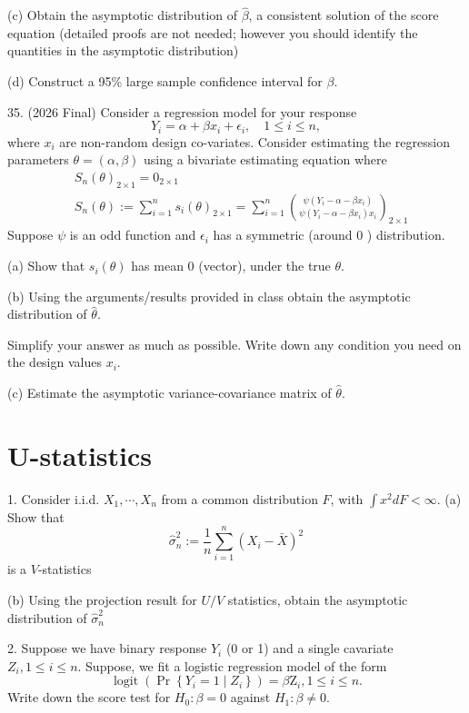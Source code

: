 \documentclass[11pt]{article}
\theoremstyle{definition}
\begin{document}
(c) Obtain the asymptotic distribution of $\widehat{\beta}$, a consistent solution of the score equation (detailed proofs are not needed; however you should identify the quantities in the asymptotic distribution)

(d) Construct a 95\% large sample confidence interval for $\beta$.

35. (2026 Final) Consider a regression model for your response
$$
Y_i=\alpha+\beta x_i+\epsilon_{i},\quad 1 \leq i \leq n,
$$
where $x_i$ are non-random design co-variates. Consider estimating the regression parameters $\theta=(\alpha, \beta)$ using a bivariate estimating equation
where
$$
\begin{aligned}
& S_n(\theta)_{2 \times 1}=0_{2 \times 1} \\
& S_n(\theta):=\sum_{i=1}^n s_i(\theta)_{2 \times 1}=\sum_{i=1}^n\binom{\psi\left(Y_i-\alpha-\beta x_i\right)}{\psi\left(Y_i-\alpha-\beta x_i\right) x_i}_{2 \times 1}
\end{aligned}
$$
Suppose $\psi$ is an odd function and $\epsilon_i$ has a symmetric (around 0 ) distribution.

(a) Show that $s_i(\theta)$ has mean 0 (vector), under the true $\theta$.

(b) Using the arguments/results provided in class obtain the asymptotic distribution of $\widehat{\theta}$.

Simplify your answer as much as possible. Write down any condition you need on the design values $x_i$.

(c) Estimate the asymptotic variance-covariance matrix of $\hat{\theta}$.

\newpage

\section{U-statistics}
1. Consider i.i.d. $X_1, \cdots, X_n$ from a common distribution $F$, with $\int x^2 d F<\infty$.
(a) Show that
$$
\widehat{\sigma}_n^2:=\frac{1}{n} \sum_{i=1}^n\left(X_i-\bar{X}\right)^2
$$
is a $V$-statistics

(b) Using the projection result for $U / V$ statistics, obtain the asymptotic distribution of $\widehat{\sigma}_n^2$

2. Suppose we have binary response $Y_i$ (0 or 1) and a single cavariate $Z_i, 1 \leq i \leq n$. Suppose, we fit a logistic regression model of the form
$$
\operatorname{logit}\left(\operatorname{Pr}\left\{Y_i=1 \mid Z_i\right\}\right)=\beta \mathrm{Z}_i, 1 \leq i \leq n .
$$
Write down the score test for $H_0: \beta=0$ against $H_1: \beta \neq 0$.
\end{document}
